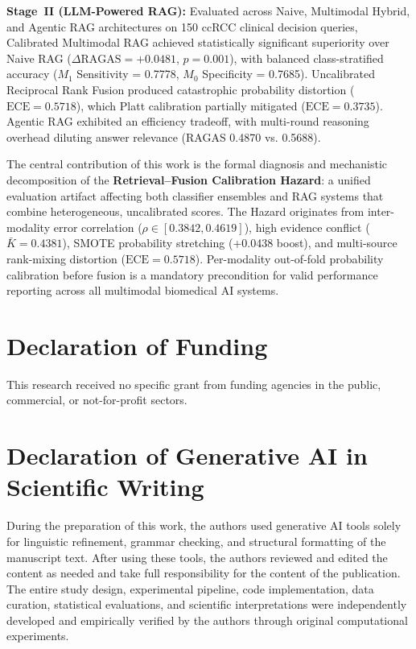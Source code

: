 \textbf{Stage~II (LLM-Powered RAG):} Evaluated across Naive, Multimodal Hybrid, and Agentic RAG architectures on 150 ccRCC clinical decision queries, Calibrated Multimodal RAG achieved statistically significant superiority over Naive RAG ($\Delta \text{RAGAS} = +0.0481$, $p = 0.001$), with balanced class-stratified accuracy ($M_1$ Sensitivity = 0.7778, $M_0$ Specificity = 0.7685). Uncalibrated Reciprocal Rank Fusion produced catastrophic probability distortion ($\text{ECE} = 0.5718$), which Platt calibration partially mitigated ($\text{ECE} = 0.3735$). Agentic RAG exhibited an efficiency tradeoff, with multi-round reasoning overhead diluting answer relevance (RAGAS 0.4870 vs. 0.5688).

The central contribution of this work is the formal diagnosis and mechanistic decomposition of the \textbf{Retrieval--Fusion Calibration Hazard}: a unified evaluation artifact affecting both classifier ensembles and RAG systems that combine heterogeneous, uncalibrated scores. The Hazard originates from inter-modality error correlation ($\rho \in [0.3842, 0.4619]$), high evidence conflict ($\bar{K} = 0.4381$), SMOTE probability stretching (+0.0438 boost), and multi-source rank-mixing distortion ($\text{ECE} = 0.5718$). Per-modality out-of-fold probability calibration before fusion is a mandatory precondition for valid performance reporting across all multimodal biomedical AI systems.

\section*{Declaration of Funding}
This research received no specific grant from funding agencies in the public, commercial, or not-for-profit sectors.

\section*{Declaration of Generative AI in Scientific Writing}
During the preparation of this work, the authors used generative AI tools solely for linguistic refinement, grammar checking, and structural formatting of the manuscript text. After using these tools, the authors reviewed and edited the content as needed and take full responsibility for the content of the publication. The entire study design, experimental pipeline, code implementation, data curation, statistical evaluations, and scientific interpretations were independently developed and empirically verified by the authors through original computational experiments.

